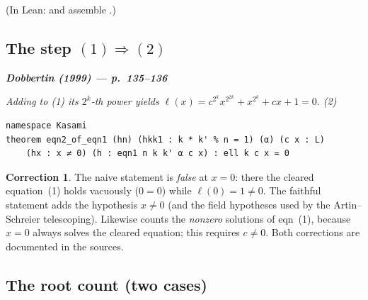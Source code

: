 \documentclass[11pt]{article}
\newenvironment{paperquote}[1]
 {\par\smallskip\noindent
  \def\FrameCommand{\color{quotebar}\vrule width 3pt\hspace{8pt}}%
  \MakeFramed{\advance\hsize-\width \FrameRestore}%
  \small\itshape
  \noindent\normalfont\footnotesize\textbf{\textsf{Dobbertin (1999) --- #1}}\par\nobreak\smallskip\itshape}
 {\endMakeFramed\par\smallskip}
\theoremstyle{definition}
\newtheorem{correction}{Correction}
\begin{document}
\noindent(In Lean:  and 
assemble .)

\subsection{The step $(1)\Rightarrow(2)$}

\begin{paperquote}{p.~135--136}
Adding to (1) its $2^k$-th power yields
$\ell(x)=c^{2^k}x^{2^{2k}}+x^{2^k}+cx+1=0.$ \hfill (2)
\end{paperquote}

\begin{lstlisting}
namespace Kasami
theorem eqn2_of_eqn1 (hn) (hkk1 : k * k' % n = 1) (α) (c x : L)
    (hx : x ≠ 0) (h : eqn1 n k k' α c x) : ell k c x = 0
\end{lstlisting}

\begin{correction}
The naive statement is \emph{false} at $x=0$: there the cleared equation~(1)
holds vacuously ($0=0$) while $\ell(0)=1\neq 0$.  The faithful statement adds the
hypothesis $x\neq 0$ (and the field hypotheses used by the Artin--Schreier
telescoping).  Likewise  counts the \emph{nonzero}
solutions of eqn~(1), because $x=0$ always solves the cleared equation; this
requires $c\neq 0$.  Both corrections are documented in the sources.
\end{correction}

\subsection{The root count (two cases)}

\begin{center}
\end{center}
\end{document}
